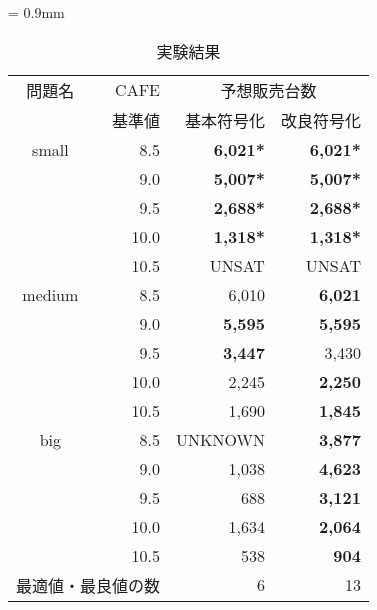 \begin{table}[tb]
  \caption{実験結果}
  \centering
  \tabcolsep = 0.9mm
  \begin{tabular}{c|r|rr} \bhline
    問題名 & CAFE & \multicolumn{2}{c}{予想販売台数} \\ \cline{3-4}
           & 基準値 & 基本符号化             & 改良符号化 \\\hline    
    small & 8.5   & \textbf{6,021*}       & \textbf{6,021*}       \\
           & 9.0   & \textbf{5,007*}       & \textbf{5,007*}       \\
           & 9.5   & \textbf{2,688*}       & \textbf{2,688*}       \\
           & 10.0  & \textbf{1,318*}       & \textbf{1,318*}       \\
           & 10.5  & \textsf{UNSAT}        & \textsf{UNSAT}       \\ \hline
    medium & 8.5  & 6,010                 & \textbf{6,021}        \\
           & 9.0  & \textbf{5,595}        & \textbf{5,595}        \\
           & 9.5  & \textbf{3,447}        & 3,430                 \\
           & 10.0 & 2,245                 & \textbf{2,250}        \\
           & 10.5 & 1,690                 & \textbf{1,845}        \\ \hline
    big   & 8.5   & \textsf{UNKNOWN}       & \textbf{3,877}        \\
           & 9.0   & 1,038                 & \textbf{4,623}        \\
           & 9.5   & 688                   & \textbf{3,121}        \\
           & 10.0  & 1,634                 & \textbf{2,064}        \\
           & 10.5  & 538                   & \textbf{904}          \\ \hline \hline
    \multicolumn{2}{c}{最適値・最良値の数} & 6 & 13                       \\ \hline
 \end{tabular}
 \label{tab:result}
\end{table}
